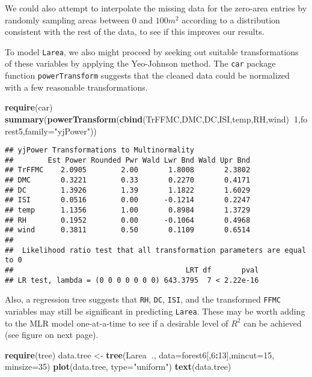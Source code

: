 \documentclass[]{article}
\newenvironment{Shaded}{\begin{snugshade}}{\end{snugshade}}
\newcommand{\KeywordTok}[1]{\textcolor[rgb]{0.13,0.29,0.53}{\textbf{#1}}}
\newcommand{\DataTypeTok}[1]{\textcolor[rgb]{0.13,0.29,0.53}{#1}}
\newcommand{\DecValTok}[1]{\textcolor[rgb]{0.00,0.00,0.81}{#1}}
\newcommand{\StringTok}[1]{\textcolor[rgb]{0.31,0.60,0.02}{#1}}
\newcommand{\OperatorTok}[1]{\textcolor[rgb]{0.81,0.36,0.00}{\textbf{#1}}}
\newcommand{\NormalTok}[1]{#1}
\begin{document}
We could also attempt to interpolate the missing data for the zero-area
entries by randomly sampling areas between \(0\) and \(100m^2\)
according to a distribution consistent with the rest of the data, to see
if this improves our results.

To model \texttt{Larea}, we also might proceed by seeking out suitable
transformations of these variables by applying the Yeo-Johnson method.
The \texttt{car} package function \texttt{powerTransform} suggests that
the cleaned data could be normalized with a few reasonable
transformations.

\begin{Shaded}
\begin{Highlighting}[]
\KeywordTok{require}\NormalTok{(car)}
\KeywordTok{summary}\NormalTok{(}\KeywordTok{powerTransform}\NormalTok{(}\KeywordTok{cbind}\NormalTok{(TrFFMC,DMC,DC,ISI,temp,RH,wind)}\OperatorTok{~}\DecValTok{1}\NormalTok{,forest5,}\DataTypeTok{family=}\StringTok{"yjPower"}\NormalTok{))}
\end{Highlighting}
\end{Shaded}

\begin{verbatim}
## yjPower Transformations to Multinormality 
##        Est Power Rounded Pwr Wald Lwr Bnd Wald Upr Bnd
## TrFFMC    2.0905        2.00       1.8008       2.3802
## DMC       0.3221        0.33       0.2270       0.4171
## DC        1.3926        1.39       1.1822       1.6029
## ISI       0.0516        0.00      -0.1214       0.2247
## temp      1.1356        1.00       0.8984       1.3729
## RH        0.1952        0.00      -0.1064       0.4968
## wind      0.3811        0.50       0.1109       0.6514
## 
##  Likelihood ratio test that all transformation parameters are equal to 0
##                                        LRT df       pval
## LR test, lambda = (0 0 0 0 0 0 0) 643.3795  7 < 2.22e-16
\end{verbatim}

Also, a regression tree suggests that \texttt{RH}, \texttt{DC},
\texttt{ISI}, and the transformed \texttt{FFMC} variables may still be
significant in predicting \texttt{Larea}. These may be worth adding to
the MLR model one-at-a-time to see if a desirable level of \(R^2\) can
be achieved (see figure on next page).

\begin{Shaded}
\begin{Highlighting}[]
\KeywordTok{require}\NormalTok{(tree)}
\NormalTok{data.tree <-}\StringTok{ }\KeywordTok{tree}\NormalTok{(Larea}\OperatorTok{~}\NormalTok{., }\DataTypeTok{data=}\NormalTok{forest6[,}\DecValTok{6}\OperatorTok{:}\DecValTok{13}\NormalTok{],}\DataTypeTok{mincut=}\DecValTok{15}\NormalTok{, }\DataTypeTok{minsize=}\DecValTok{35}\NormalTok{)}
\KeywordTok{plot}\NormalTok{(data.tree, }\DataTypeTok{type=}\StringTok{"uniform"}\NormalTok{)}
\KeywordTok{text}\NormalTok{(data.tree)}
\end{Highlighting}
\end{Shaded}
\end{document}
